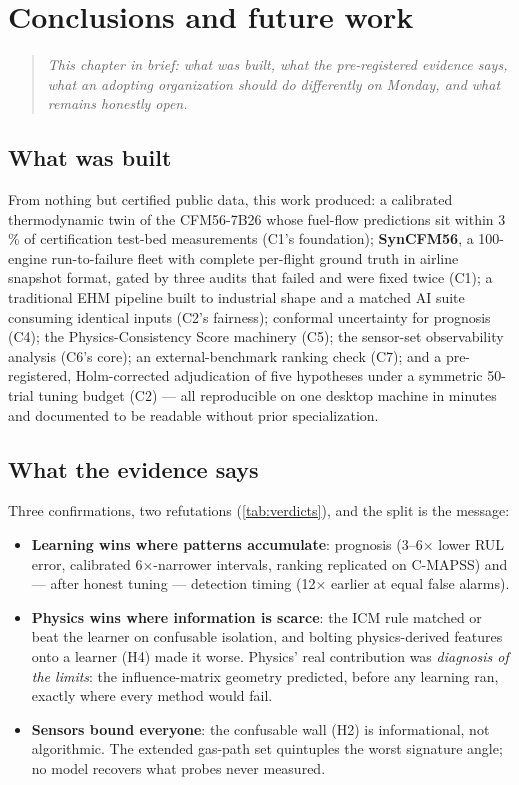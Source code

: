 \chapter{Conclusions and future work}
\label{ch:conclusions}

\begin{quote}\itshape
This chapter in brief: what was built, what the pre-registered evidence says, what an
adopting organization should do differently on Monday, and what remains honestly open.
\end{quote}

\section{What was built}

From nothing but certified public data, this work produced: a calibrated thermodynamic twin
of the CFM56-7B26 whose fuel-flow predictions sit within 3\,\% of certification test-bed
measurements (C1's foundation); \textbf{SynCFM56}, a 100-engine run-to-failure fleet with
complete per-flight ground truth in airline snapshot format, gated by three audits that
failed and were fixed twice (C1); a traditional EHM pipeline built to industrial shape and a
matched AI suite consuming identical inputs (C2's fairness); conformal uncertainty for
prognosis (C4); the Physics-Consistency Score machinery (C5); the sensor-set observability
analysis (C6's core); an external-benchmark ranking check (C7); and a pre-registered,
Holm-corrected adjudication of five hypotheses under a symmetric 50-trial tuning budget (C2)
--- all reproducible on one desktop machine in minutes and documented to be readable without
prior specialization.

\section{What the evidence says}

Three confirmations, two refutations (\cref{tab:verdicts}), and the split is the message:

\begin{itemize}
  \item \textbf{Learning wins where patterns accumulate}: prognosis (3--6$\times$ lower RUL
    error, calibrated 6$\times$-narrower intervals, ranking replicated on C-MAPSS) and ---
    after honest tuning --- detection timing (12$\times$ earlier at equal false alarms).
  \item \textbf{Physics wins where information is scarce}: the ICM rule matched or beat the
    learner on confusable isolation, and bolting physics-derived features onto a learner
    (H4) made it worse. Physics' real contribution was \emph{diagnosis of the limits}: the
    influence-matrix geometry predicted, before any learning ran, exactly where every method
    would fail.
  \item \textbf{Sensors bound everyone}: the confusable wall (H2) is informational, not
    algorithmic. The extended gas-path set quintuples the worst signature angle; no model
    recovers what probes never measured.
\end{itemize}

